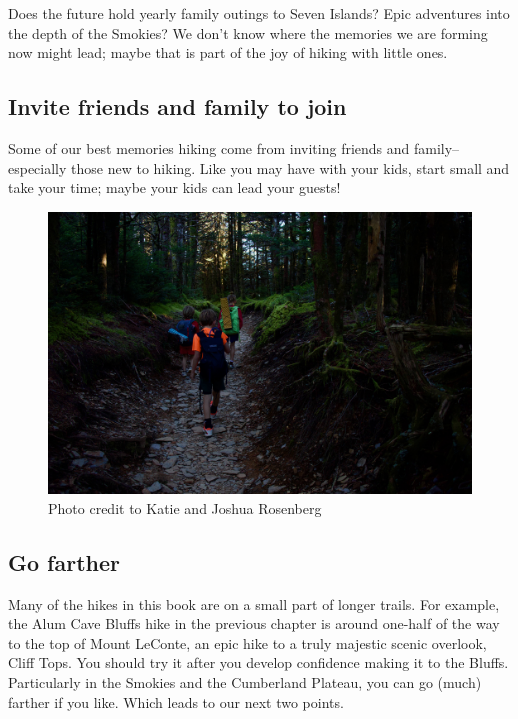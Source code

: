 \documentclass[
  letterpaper,
  DIV=11,
  numbers=noendperiod]{scrreprt}
\begin{document}
Does the future hold yearly family outings to Seven Islands? Epic
adventures into the depth of the Smokies? We don't know where the
memories we are forming now might lead; maybe that is part of the joy of
hiking with little ones.

\subsection{Invite friends and family to
join}\label{invite-friends-and-family-to-join}

Some of our best memories hiking come from inviting friends and
family--especially those new to hiking. Like you may have with your
kids, start small and take your time; maybe your kids can lead your
guests!

\begin{figure}[H]

{\centering \includegraphics[width=10.41667in,height=\textheight,keepaspectratio]{img/kids-leconte.jpeg}

}

\caption{Photo credit to Katie and Joshua Rosenberg}

\end{figure}%

\subsection{Go farther}\label{go-farther}

Many of the hikes in this book are on a small part of longer trails. For
example, the Alum Cave Bluffs hike in the previous chapter is around
one-half of the way to the top of Mount LeConte, an epic hike to a truly
majestic scenic overlook, Cliff Tops. You should try it after you
develop confidence making it to the Bluffs. Particularly in the Smokies
and the Cumberland Plateau, you can go (much) farther if you like. Which
leads to our next two points.
\end{document}
